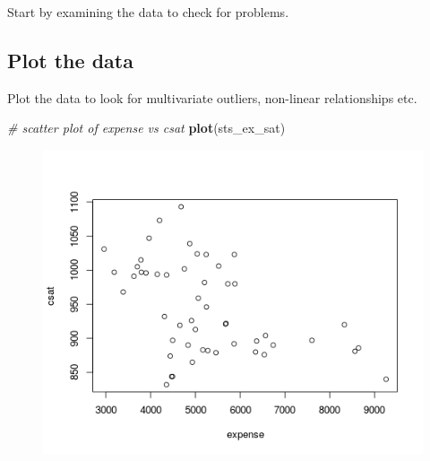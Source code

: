 \documentclass[]{book}
\newenvironment{Shaded}{\begin{snugshade}}{\end{snugshade}}
\newcommand{\KeywordTok}[1]{\textcolor[rgb]{0.13,0.29,0.53}{\textbf{#1}}}
\newcommand{\DataTypeTok}[1]{\textcolor[rgb]{0.13,0.29,0.53}{#1}}
\newcommand{\StringTok}[1]{\textcolor[rgb]{0.31,0.60,0.02}{#1}}
\newcommand{\CommentTok}[1]{\textcolor[rgb]{0.56,0.35,0.01}{\textit{#1}}}
\newcommand{\OperatorTok}[1]{\textcolor[rgb]{0.81,0.36,0.00}{\textbf{#1}}}
\newcommand{\NormalTok}[1]{#1}
\begin{document}
Start by examining the data to check for problems.

\begin{Shaded}
\end{Shaded}

\subsection{Plot the data}\label{plot-the-data}

Plot the data to look for multivariate outliers, non-linear
relationships etc.

\begin{Shaded}
\begin{Highlighting}[]
  \CommentTok{# scatter plot of expense vs csat}
  \KeywordTok{plot}\NormalTok{(sts_ex_sat)}
\end{Highlighting}
\end{Shaded}

\begin{figure}
\centering
\includegraphics{R/Rmodels/images/statesCorr1.png}
\caption{}
\end{figure}
\end{document}
